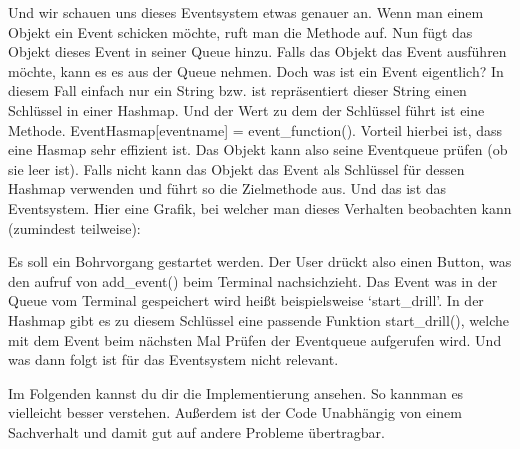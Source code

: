 \documentclass[letterpaper,10pt,english]{sphinxmanual}
\let\sphinxpxdimen\pdfpxdimen\else\newdimen\sphinxpxdimen
\begin{document}
\sphinxAtStartPar
Und wir schauen uns dieses Eventsystem etwas genauer an.
Wenn man einem Objekt ein Event schicken möchte, ruft man die \sphinxhyphen{}Methode auf. Nun fügt das Objekt dieses Event in seiner Queue hinzu.
Falls das Objekt das Event ausführen möchte, kann es es aus der Queue nehmen. Doch was ist ein Event eigentlich? In diesem Fall einfach nur ein String bzw. ist repräsentiert dieser String einen Schlüssel in einer Hashmap. Und der Wert zu dem der Schlüssel führt ist eine Methode. EventHasmap{[}eventname{]} = event\_function(). Vorteil hierbei ist, dass eine Hasmap sehr effizient ist.
Das Objekt kann also seine Eventqueue prüfen (ob sie leer ist). Falls nicht kann das Objekt das Event als Schlüssel für dessen Hashmap verwenden und führt so die Zielmethode aus. Und das ist das Eventsystem.
Hier eine Grafik, bei welcher man dieses Verhalten beobachten kann (zumindest teilweise):

\noindent\sphinxincludegraphics[width=800\sphinxpxdimen]{{code_explanation_3}.jpg}

\sphinxAtStartPar
Es soll ein Bohrvorgang gestartet werden. Der User drückt also einen Button, was den aufruf von add\_event() beim Terminal nachsichzieht. Das Event was in der Queue vom Terminal gespeichert wird heißt beispielsweise ‘start\_drill’. In der Hashmap gibt es zu diesem Schlüssel eine passende Funktion start\_drill(), welche mit dem Event beim nächsten Mal Prüfen der Eventqueue aufgerufen wird. Und was dann folgt ist für das Eventsystem nicht relevant.

\sphinxAtStartPar
Im Folgenden kannst du dir die Implementierung ansehen. So kannman es vielleicht besser verstehen. Außerdem ist der Code Unabhängig von einem Sachverhalt und damit gut auf andere Probleme übertragbar.
\end{document}
